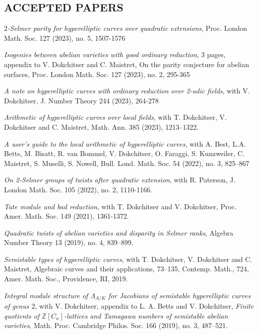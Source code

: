 \documentclass{res}
\begin{document}
\begin{resume}
\section{ACCEPTED PAPERS}         
        
\bigskip

\vspace{-0.1in}	

{\it $2$-Selmer parity for hyperelliptic curves over quadratic extensions},  Proc. London Math. Soc. 127 (2023), no. 5, 1507-1576 

{\it Isogenies between abelian varieties with good ordinary reduction}, 3 pages, appendix to  V. Dokchitser and C. Maistret, {On the parity conjecture for abelian surfaces}, Proc. London Math. Soc. 127 (2023), no. 2, 295-365 \

\vspace{-0.1in}	
{\it A note on hyperelliptic curves with ordinary reduction over 2-adic fields}, with V. Dokchitser, J. Number Theory 244 (2023), 264-278\

\vspace{-0.1in}	
{\it Arithmetic of hyperelliptic curves over local fields}, with T. Dokchitser, V. Dokchitser and C. Maistret, Math. Ann. 385 (2023), 1213–1322.  \

{\it A user's guide to the local arithmetic of hyperelliptic curves}, with A. Best, L.A. Betts, M. Bisatt, R. van Bommel, V. Dokchitser, O. Faraggi, S. Kunzweiler, C. Maistret, S. Muselli, S. Nowell,  Bull. Lond. Math. Soc. 54 (2022), no. 3, 825--867

{\it On 2-Selmer groups of twists after quadratic extension}, with R. Paterson, J. London Math. Soc. 105 (2022), no. 2, 1110-1166. \

{\it Tate module and bad reduction}, with T. Dokchitser and V. Dokchitser, Proc. Amer. Math. Soc. 149 (2021), 1361-1372.

{\it Quadratic twists of abelian varieties and disparity in Selmer ranks},  Algebra Number Theory 13 (2019), no. 4, 839–899. \

{\it Semistable types of hyperelliptic curves}, with T. Dokchitser, V. Dokchitser and C. Maistret, Algebraic curves and their applications, 73–135, Contemp. Math., 724, Amer. Math. Soc., Providence, RI, 2019. \

   {\it Integral module structure of $\Lambda_{A/K}$ for Jacobians of
semistable hyperelliptic curves of genus $2$}, with V. Dokchitser, appendix to L. A. Betts and V. Dokchitser, {\it Finite quotients of  $\mathbb{Z}[C_n]$-lattices and Tamagawa numbers of semistable abelian varieties}, Math. Proc. Cambridge Philos. Soc. 166 (2019), no. 3, 487–521. 
%

\end{resume}
\end{document}
